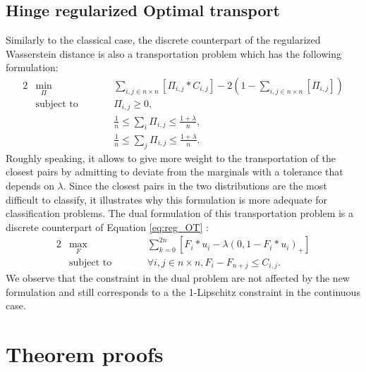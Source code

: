 \subsection{Hinge regularized Optimal transport}
Similarly to the classical case, the discrete counterpart of the regularized Wasserstein distance is also a transportation problem which has the following formulation:
\begin{alignat*}{2}
&\!\min_{\Pi}        &\qquad& \sum_{i,j \in n\times n}\left[\Pi_{i,j}*C_{i,j}\right]-2\left(1-\sum_{i,j \in  n\times n}\left[\Pi_{i,j}\right]\right)\\
&\text{subject to} &      & \Pi_{i,j} \geq 0,\\
&                  &      & \frac{1}{n} \leq \sum_i \Pi_{i,j} \leq  \frac{1+\lambda}{n},\\
&                  &      & \frac{1}{n} \leq \sum_j \Pi_{i,j} \leq  \frac{1+\lambda}{n}.
\end{alignat*}
Roughly speaking, it allows to give more weight to the transportation of the closest pairs by admitting to deviate from the marginals with a tolerance that depends on $\lambda$. Since the closest pairs in the two distributions are the most difficult to classify, it illustrates why this formulation is more adequate for classification problems. 
The dual formulation of this transportation problem is a discrete counterpart of Equation \ref{eq:reg_OT} :
\begin{alignat*}{2}
&\!\max_{F}        &\qquad& \sum_{k =0}^{2n} \left[F_i*u_i -\lambda (0,1-F_i*u_i)_+\right]\\
&\text{subject to} &      & \forall i,j \in n\times n, F_i-F_{n+j}\leq C_{i,j}.
\end{alignat*}
We observe that the constraint in the dual problem are not affected by the new formulation and still corresponds to a the 1-Lipschitz constraint in the continuous case. 


\section{Theorem proofs}
\label{appendix:proofs}
